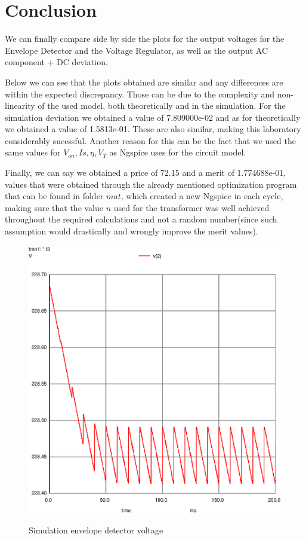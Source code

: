 \newpage
\section{Conclusion}
\label{sec:conclusion}

We can finally compare side by side the plots for the output voltages for the Envelope Detector and the Voltage Regulator, as well as the output AC component + DC deviation. 

Below we can see that the plots obtained are similar and any differences are within the expected discrepancy. Those can be due to the complexity and non-linearity of the used model, both theoretically and in the simulation. For the simulation deviation we obtained a value of 7.809000e-02 and as for theoretically we obtained a value of 1.5813e-01. These are also similar, making this laboratory considerably sucessful. Another reason for this can be the fact that we used the same values for $V_{on}, Is, \eta, V_{T}$ as Ngspice uses for the circuit model.

Finally, we can say we obtained a price of 72.15 and a merit of 1.774688e-01, values that were obtained through the already mentioned  optimization program that can be found in folder $mat$, which created a new Ngspice in each cycle, making sure that the value $n$ used for the transformer was well achieved throughout the required calculations and not a random number(since such assumption would drastically and wrongly improve the merit values).

\newpage
\begin{figure}[!ht] \centering
\caption{Simulation envelope detector voltage}
\includegraphics[width=0.6\linewidth]{venv.eps}
\label{fig:sim1}
\end{figure}

